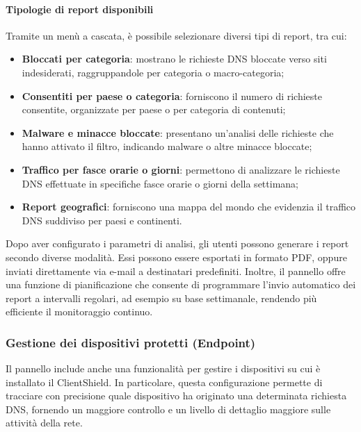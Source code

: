 \paragraph{Tipologie di report disponibili}
Tramite un menù a cascata, è possibile selezionare diversi tipi di report, tra cui:
\begin{itemize}
  \item \textbf{Bloccati per categoria}: mostrano le richieste DNS bloccate verso siti indesiderati, raggruppandole per categoria o macro-categoria;
  \item \textbf{Consentiti per paese o categoria}: forniscono il numero di richieste consentite, organizzate per paese o per categoria di contenuti;
  \item \textbf{Malware e minacce bloccate}: presentano un’analisi delle richieste che hanno attivato il filtro, indicando malware o altre minacce bloccate;
  \item \textbf{Traffico per fasce orarie o giorni}: permettono di analizzare le richieste DNS effettuate in specifiche fasce orarie o giorni della settimana;
  \item \textbf{Report geografici}: forniscono una mappa del mondo che evidenzia il traffico DNS suddiviso per paesi e continenti.
\end{itemize}

Dopo aver configurato i parametri di analisi, gli utenti possono generare i report secondo diverse modalità. Essi possono essere esportati in formato PDF, oppure inviati direttamente via e-mail a destinatari predefiniti. Inoltre, il pannello offre una funzione di pianificazione che consente di programmare l'invio automatico dei report a intervalli regolari, ad esempio su base settimanale, rendendo più efficiente il monitoraggio continuo.

\subsubsection{Gestione dei dispositivi protetti (Endpoint)}
Il pannello include anche una funzionalità per gestire i dispositivi su cui è installato il ClientShield. In particolare, questa configurazione permette di tracciare con precisione quale dispositivo ha originato una determinata richiesta DNS, fornendo un maggiore controllo e un livello di dettaglio maggiore sulle attività della rete.


